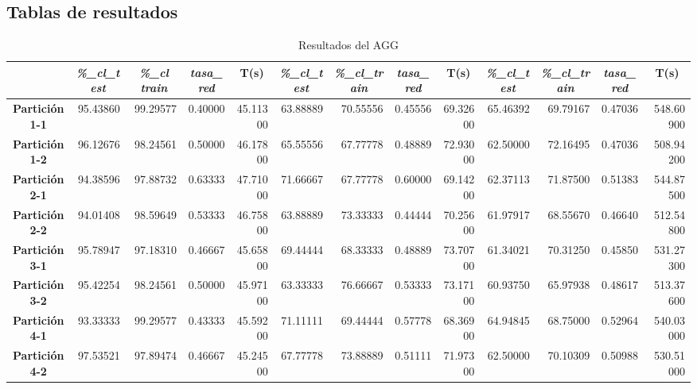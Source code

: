 \documentclass[a4paper,11pt]{article}
\begin{document}
 \subsection{Tablas de resultados}
 \begin{table}[H]	
    \caption*{Resultados del AGG}
    \begin{adjustbox}{width=1.1\textwidth}
    \begin{tabular}{|c|r|r|r|r|r|r|r|r|r|r|r|r|}
    \hline
    \multicolumn{1}{|l|}{} & \multicolumn{1}{c|}{\textbf{\textit{\%\_cl\_test}}} & \multicolumn{1}{c|}{\textbf{\textit{\%\_cl train}}} & \multicolumn{1}{c|}{\textbf{\textit{tasa\_red}}} & \multicolumn{1}{c|}{\textbf{T(s)}} & \multicolumn{1}{c|}{\textbf{\textit{\%\_cl\_test}}} & \multicolumn{1}{c|}{\textbf{\textit{\%\_cl\_train}}} & \multicolumn{1}{c|}{\textbf{\textit{tasa\_red}}} & \multicolumn{1}{c|}{\textbf{T(s)}} & \multicolumn{1}{c|}{\textbf{\textit{\%\_cl\_test}}} & \multicolumn{1}{c|}{\textbf{\textit{\%\_cl\_train}}} & \multicolumn{1}{c|}{\textbf{\textit{tasa\_red}}} & \multicolumn{1}{c|}{\textbf{T(s)}} \\ \hline
    \textbf{Partición 1-1} & 95.43860 & 99.29577 & 0.40000 & 45.11300 & 63.88889 & 70.55556 & 0.45556 & 69.32600 & 65.46392 & 69.79167 & 0.47036 & 548.60900 \\ \hline
    \textbf{Partición 1-2} & 96.12676 & 98.24561 & 0.50000 & 46.17800 & 65.55556 & 67.77778 & 0.48889 & 72.93000 & 62.50000 & 72.16495 & 0.47036 & 508.94200 \\ \hline
    \textbf{Partición 2-1} & 94.38596 & 97.88732 & 0.63333 & 47.71000 & 71.66667 & 67.77778 & 0.60000 & 69.14200 & 62.37113 & 71.87500 & 0.51383 & 544.87500 \\ \hline
    \textbf{Partición 2-2} & 94.01408 & 98.59649 & 0.53333 & 46.75800 & 63.88889 & 73.33333 & 0.44444 & 70.25600 & 61.97917 & 68.55670 & 0.46640 & 512.54800 \\ \hline
    \textbf{Partición 3-1} & 95.78947 & 97.18310 & 0.46667 & 45.65800 & 69.44444 & 68.33333 & 0.48889 & 73.70700 & 61.34021 & 70.31250 & 0.45850 & 531.27300 \\ \hline
    \textbf{Partición 3-2} & 95.42254 & 98.24561 & 0.50000 & 45.97100 & 63.33333 & 76.66667 & 0.53333 & 73.17100 & 60.93750 & 65.97938 & 0.48617 & 513.37600 \\ \hline
    \textbf{Partición 4-1} & 93.33333 & 99.29577 & 0.43333 & 45.59200 & 71.11111 & 69.44444 & 0.57778 & 68.36900 & 64.94845 & 68.75000 & 0.52964 & 540.03000 \\ \hline
    \textbf{Partición 4-2} & 97.53521 & 97.89474 & 0.46667 & 45.24500 & 67.77778 & 73.88889 & 0.51111 & 71.97300 & 62.50000 & 70.10309 & 0.50988 & 530.51000 \\ \hline

\end{tabular}
\end{adjustbox}
\end{table}
\end{document}
